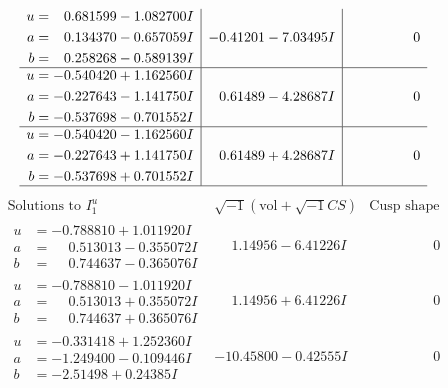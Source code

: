 \documentclass[1p]{elsarticle_modified}
\theoremstyle{definition}
\newcommand{\I}{\sqrt{-1}}
\begin{document}
$$\begin{array}{c|c|c}
\begin{aligned}
u &= \phantom{-}0.681599 - 1.082700 I \\
a &= \phantom{-}0.134370 - 0.657059 I \\
b &= \phantom{-}0.258268 - 0.589139 I\end{aligned}
 & -0.41201 - 7.03495 I & \phantom{-0.000000 } 0 \\ \hline\begin{aligned}
u &= -0.540420 + 1.162560 I \\
a &= -0.227643 - 1.141750 I \\
b &= -0.537698 - 0.701552 I\end{aligned}
 & \phantom{-}0.61489 - 4.28687 I & \phantom{-0.000000 } 0 \\ \hline\begin{aligned}
u &= -0.540420 - 1.162560 I \\
a &= -0.227643 + 1.141750 I \\
b &= -0.537698 + 0.701552 I\end{aligned}
 & \phantom{-}0.61489 + 4.28687 I & \phantom{-0.000000 } 0\\
 \hline 
 \end{array}$$\newpage$$\begin{array}{c|c|c}  
\text{Solutions to }I^u_{1}& \I (\text{vol} + \sqrt{-1}CS) & \text{Cusp shape}\\
 \hline 
\begin{aligned}
u &= -0.788810 + 1.011920 I \\
a &= \phantom{-}0.513013 - 0.355072 I \\
b &= \phantom{-}0.744637 - 0.365076 I\end{aligned}
 & \phantom{-}1.14956 - 6.41226 I & \phantom{-0.000000 } 0 \\ \hline\begin{aligned}
u &= -0.788810 - 1.011920 I \\
a &= \phantom{-}0.513013 + 0.355072 I \\
b &= \phantom{-}0.744637 + 0.365076 I\end{aligned}
 & \phantom{-}1.14956 + 6.41226 I & \phantom{-0.000000 } 0 \\ \hline\begin{aligned}
u &= -0.331418 + 1.252360 I \\
a &= -1.249400 - 0.109446 I \\
b &= -2.51498 + 0.24385 I\end{aligned}
 & -10.45800 - 0.42555 I & \phantom{-0.000000 } 0 \\ \hline\begin{aligned}

\end{aligned}
\end{array}$$
\end{document}
